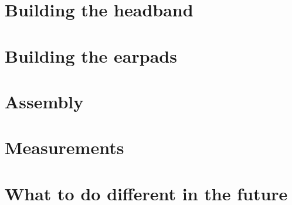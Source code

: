 \documentclass{article}
\begin{document}
\section{Building the headband}
\label{s:headband}

\section{Building the earpads}
\label{s:pads}

\section{Assembly}
\label{s:assembly}

\section{Measurements}
\label{s:measurements}

\section{What to do different in the future}
\label{s:future}



\end{document}
